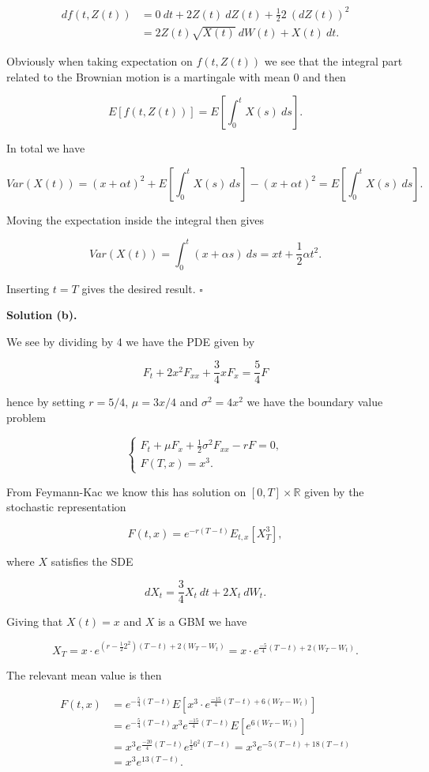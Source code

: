 \documentclass[
]{article}
\begin{document}
\begin{align*}
df(t,Z(t))&=0\ dt+2Z(t)\ dZ(t)+\frac{1}{2}2\ (dZ(t))^2\\
&=2Z(t)\sqrt{X(t)}\ dW(t)+X(t)\ dt.
\end{align*}

Obviously when taking expectation on \(f(t,Z(t))\) we see that the
integral part related to the Brownian motion is a martingale with mean 0
and then

\[
E[f(t,Z(t))]=E\left[\int_0^t X(s)\ ds\right].
\]

In total we have

\[
Var(X(t))=(x+\alpha t)^2+E\left[\int_0^t X(s)\ ds\right]-(x+\alpha t)^2=E\left[\int_0^t X(s)\ ds\right].
\]

Moving the expectation inside the integral then gives

\[
Var(X(t))=\int_0^t(x+\alpha s)\ ds=xt+\frac{1}{2}\alpha t^2.
\]

Inserting \(t=T\) gives the desired result. \(\square\)

\textbf{Solution (b).}

We see by dividing by 4 we have the PDE given by

\[
F_t+2x^2F_{xx}+\frac{3}{4}xF_x=\frac{5}{4}F
\]

hence by setting \(r=5/4\), \(\mu=3x/4\) and \(\sigma^2=4x^2\) we have
the boundary value problem

\[
\begin{cases}
F_t+\mu F_x+\frac{1}{2}\sigma ^2F_{xx}-rF=0,\\
F(T,x)=x^3.
\end{cases}
\]

From Feymann-Kac we know this has solution on \([0,T]\times\mathbb{R}\)
given by the stochastic representation

\[
F(t,x)=e^{-r(T-t)}E_{t,x}[X_T^3],
\]

where \(X\) satisfies the SDE

\[
dX_t=\frac{3}{4}X_t\ dt+2X_t\ dW_t.
\]

Giving that \(X(t)=x\) and \(X\) is a GBM we have

\[
X_T=x\cdot e^{\left(r-\frac{1}{2}2^2\right)(T-t)+2(W_T-W_t)}=x\cdot e^{\frac{-5}{4}(T-t)+2(W_T-W_t)}.
\]

The relevant mean value is then

\begin{align*}
F(t,x)&=e^{-\frac{5}{4}(T-t)}E\left[x^3\cdot e^{\frac{-15}{4}(T-t)+6(W_T-W_t)}\right]\\
&=e^{-\frac{5}{4}(T-t)}x^3e^{\frac{-15}{4}(T-t)}E\left[e^{6(W_T-W_t)}\right]\\
&=x^3e^{\frac{-20}{4}(T-t)}e^{\frac{1}{2}6^2(T-t)}=x^3e^{-5(T-t)+18(T-t)}\\
&=x^3e^{13(T-t)}.
\end{align*}
\end{document}
